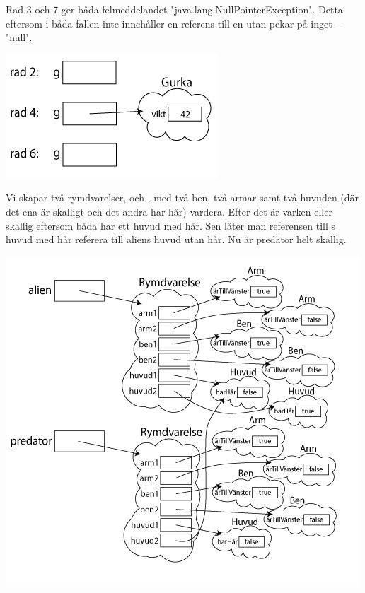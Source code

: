 
\ExerciseSolution{\ExeWeekSIX}

\BasicTasks %

\Task %

\Subtask Rad 3 och 7 ger båda felmeddelandet "java.lang.NullPointerException". Detta eftersom  i båda fallen inte innehåller en referens till en  utan pekar på inget -- "null".

\Subtask \includegraphics[scale=0.6]{../img/w06-solutions/1b}

\Task %

\Subtask Vi skapar två rymdvarelser,  och , med två ben, två armar samt två huvuden (där det ena är skalligt och det andra har hår) vardera. Efter det är varken  eller  skallig eftersom båda har ett huvud med hår. Sen låter man referensen till s huvud med hår referera till aliens huvud utan hår. Nu är predator helt skallig.

\Subtask  \includegraphics[scale=0.7]{../img/w06-solutions/2b}

